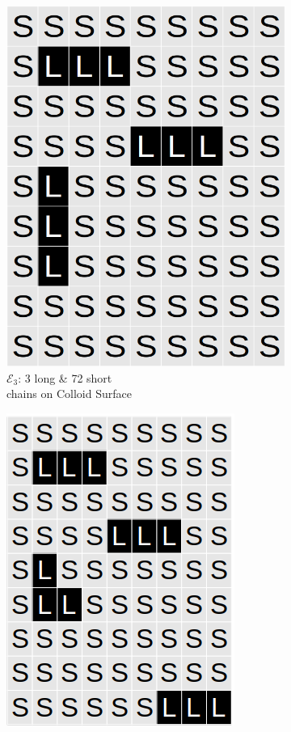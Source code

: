 \documentclass[journal=mamobx,manuscript=article]{achemso}
\begin{document}
\begin{figure}[H]
\begin{subfigure}[b]{0.4\textwidth}
        \includegraphics[scale=0.15]{Sup_Fig1d.png}
        \caption{$\mathcal{E}_3$:  3 long \& 72 short \\chains on Colloid Surface}
        \label{fig:D}
    \end{subfigure}
    \begin{subfigure}[b]{0.4\textwidth}
        \includegraphics[scale=0.315]{Sup_Fig1e.png}

\end{subfigure}
\end{figure}
\end{document}
